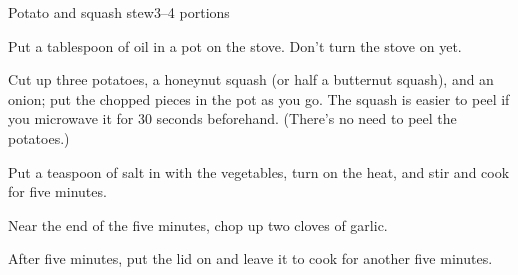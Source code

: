 \documentclass{article}
\begin{document}
  \begin{recipe}{Potato and squash stew}{3--4 portions}
    \begin{step}
      \begin{ingrs}
      \end{ingrs}
      \begin{stepdesc}
        Put a tablespoon of oil in a pot on the stove. Don't turn the stove on yet.
      \end{stepdesc}
    \end{step}
    \begin{step}
      \begin{ingrs}
      \end{ingrs}
      \begin{stepdesc}
        Cut up three potatoes, a honeynut squash (or half a butternut squash), and an onion; put the chopped pieces in the pot as you go. The squash is easier to peel if you microwave it for 30 seconds beforehand. (There's no need to peel the potatoes.)
      \end{stepdesc}
    \end{step}
    \begin{step}
      \begin{ingrs}
      \end{ingrs}
      \begin{stepdesc}
        Put a teaspoon of salt in with the vegetables, turn on the heat, and stir and cook for five minutes.
      \end{stepdesc}
    \end{step}
    \begin{step}
      \begin{ingrs}
      \end{ingrs}
      \begin{stepdesc}
        Near the end of the five minutes, chop up two cloves of garlic.
      \end{stepdesc}
    \end{step}
    \begin{step}
      \begin{ingrs}
      \end{ingrs}
      \begin{stepdesc}
        After five minutes, put the lid on and leave it to cook for another five minutes.

\end{stepdesc}
\end{step}
\end{recipe}
\end{document}
